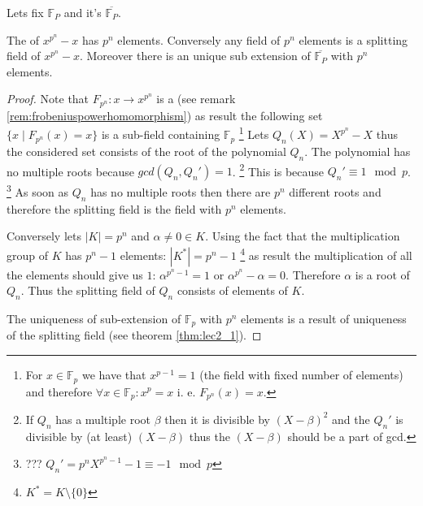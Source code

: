 \begin{theorem}
  Lets fix $\mathbb{F}_P$ and it's 
  $\overline{\mathbb{F}_P}$.

  The  of $x^{p^n} - x$ has $p^n$
  elements. Conversely any field of $p^n$ elements is a splitting
  field of $x^{p^n} - x$. Moreover there is an unique sub extension of
  $\overline{\mathbb{F}_P}$ with $p^n$ elements.
  \begin{proof}
    Note that $F_{p^n} : x \to x^{p^n}$ is a
     (see remark
    \ref{rem:frobeniuspowerhomomorphism}) as result the following set
    $\{
    x \mid F_{p^n}\left(x\right) = x
    \}$ is a sub-field containing $\mathbb{F}_p$
    \footnote{
      For $x \in \mathbb{F}_p$ we have that $x^{p-1} = 1$ (the field
      with fixed number of elements) and therefore
      $\forall x \in \mathbb{F}_p: x^p = x$ i. e.
      $F_{p^n}\left(x\right) = x$.
    }
    Lets $Q_n\left(X\right) = X^{p^n} - X$ thus the considered set
    consists of the root of the polynomial $Q_n$. The polynomial has
    no multiple roots because $gcd(Q_n, Q_n') = 1$.
    \footnote{
      If $Q_n$ has a multiple root $\beta$ then it is divisible by
      $\left(X - \beta\right)^2$ and the $Q_n'$ is divisible by (at
      least) $\left(X - \beta\right)$ thus the $\left(X -
      \beta\right)$ should be a part of gcd.
    }
    This is because $Q_n' \equiv 1 \mod p$.
    \footnote{
      ??? $Q_n' = p^n X^{p^n - 1} - 1 \equiv -1 \mod p$
    }
    As soon as $Q_n$ has no multiple roots then there are $p^n$
    different roots and therefore the splitting field is the field
    with $p^n$ elements.

    Conversely lets $\left|K\right| = p^n$ and
    $\alpha \ne 0 \in K$.
    Using the fact that the multiplication group of $K$ has $p^n - 1$
    elements: $\left|K^*\right| = p^n - 1$
    \footnote{
      $K^* = K \setminus \{0\}$
    }
    as result the multiplication of all the elements should give us
    $1$: $\alpha^{p^n-1} = 1$ or $\alpha^{p^n} - \alpha = 0$.
    Therefore $\alpha$ is a root of $Q_n$. Thus the splitting field of
    $Q_n$ consists of elements of $K$.

    The uniqueness of sub-extension of
    $\mathbb{F}_p$ with $p^n$ elements is a result of uniqueness of
    the splitting field (see theorem \ref{thm:lec2_1}). 
  \end{proof}
  \label{thm:lec3_1}
\end{theorem}

